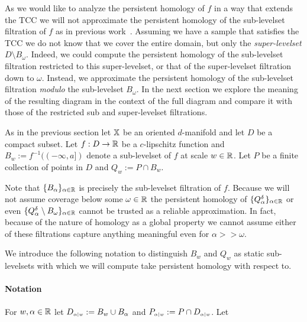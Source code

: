 
As we would like to analyze the persistent homology of $f$ in a way that extends the TCC we will not approximate the persistent homology of the sub-levelset filtration of $f$ as in previous work~\cite{chazal09analysis}.
Assuming we have a sample that satisfies the TCC we do not know that we cover the entire domain, but only the \emph{super-levelset} $D\setminus B_\omega$.
Indeed, we could compute the persistent homology of the sub-levelset filtration restricted to this super-levelset, or that of the super-levelset filtration down to $\omega$.
Instead, we approximate the persistent homology of the sub-levelset filtration \emph{modulo} the sub-levelset $B_\omega$.
In the next section we explore the meaning of the resulting diagram in the context of the full diagram and compare it with those of the restricted sub and super-levelset filtrations.

As in the previous section let $\mathbb{X}$ be an oriented $d$-manifold and let $D$ be a compact subset.
Let $f: D\to\mathbb{R}$ be a $c$-lipschitz function and $B_w := f^{-1}((-\infty,a])$ denote a sub-levelset of $f$ at scale $w\in\mathbb{R}$.
Let $P$ be a finite collection of points in $D$ and $Q_w := P\cap B_w$.

Note that $\{B_\alpha\}_{\alpha\in\mathbb{R}}$ is precisely the sub-levelset filtration of $f$.
Because we will not assume coverage below some $\omega\in\mathbb{R}$ the persistent homology of $\{Q_\alpha^\delta\}_{\alpha\in\mathbb{R}}$ or even $\{Q_\alpha^\delta\setminus B_\omega\}_{\alpha\in\mathbb{R}}$ cannot be trusted as a reliable approximation.
In fact, because of the nature of homology as a global property we cannot assume either of these filtrations capture anything meaningful even for $\alpha >> \omega$.

We introduce the following notation to distinguish $B_w$ and $Q_w$ as static sub-levelsets with which we will compute take persistent homology with respect to.

\paragraph{Notation}

For $w,\alpha\in\mathbb{R}$ let $D_{\scriptscriptstyle \alpha\mid w} := B_w\cup B_\alpha$ and $P_{\scriptscriptstyle \alpha\mid w} := P\cap D_{\scriptscriptstyle \alpha\mid w}$.
%
Let


